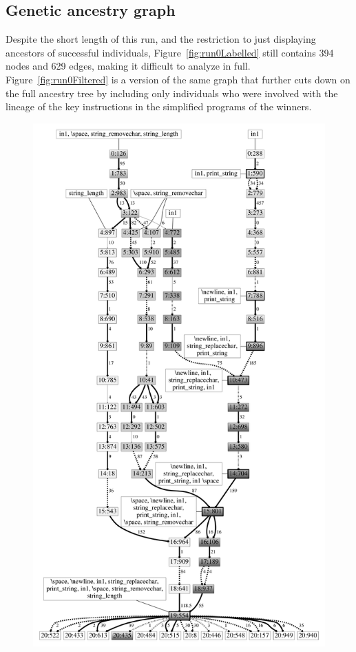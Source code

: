 \subsection{Genetic ancestry graph}

Despite the short length of this run, and the restriction to just displaying
ancestors of successful individuals, Figure~\ref{fig:run0Labelled} still
contains 394 nodes and 629 edges, making it difficult to analyze in full.
Figure~\ref{fig:run0Filtered} is a version of the same graph that further
cuts down on the full ancestry tree by including only individuals who were
involved with the lineage of the key instructions in the simplified programs of the
winners.

\begin{figure}[tb!p] %
	\begin{center}
		\includegraphics[height=\textheight]{../figures/filtered_fill}

\end{center}
\end{figure}
